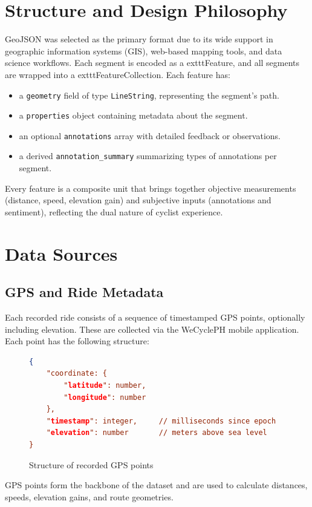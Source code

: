 \section{Structure and Design Philosophy}

GeoJSON was selected as the primary format due to its wide support in geographic information systems (GIS), web-based mapping tools, and data science workflows. Each segment is encoded as a 	exttt{Feature}, and all segments are wrapped into a 	exttt{FeatureCollection}. Each feature has:

\begin{itemize}
    \item a \texttt{geometry} field of type \texttt{LineString}, representing the segment's path.
    \item a \texttt{properties} object containing metadata about the segment.
    \item an optional \texttt{annotations} array with detailed feedback or observations.
    \item a derived \texttt{annotation\_summary} summarizing types of annotations per segment.
\end{itemize}

Every feature is a composite unit that brings together objective measurements (distance, speed, elevation gain) and subjective inputs (annotations and sentiment), reflecting the dual nature of cyclist experience.


\section{Data Sources}

\subsection{GPS and Ride Metadata}
Each recorded ride consists of a sequence of timestamped GPS points, optionally including elevation. These are collected via the WeCyclePH mobile application. Each point has the following structure:
\begin{figure}[H]
\centering
\begin{lstlisting}[language=json, label={lst:feature_pointstructure}]
{
    "coordinate: {
        "latitude": number,
        "longitude": number
    },
    "timestamp": integer,     // milliseconds since epoch
    "elevation": number       // meters above sea level
}
\end{lstlisting}
\caption{Structure of recorded GPS points}
\label{fig:PointStructure_Feature}
\end{figure}
GPS points form the backbone of the dataset and are used to calculate distances, speeds, elevation gains, and route geometries.


